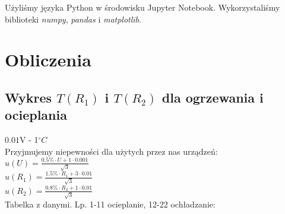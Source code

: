\documentclass[12pt]{article}
\begin{document}
Użyliśmy języka Python w środowisku Jupyter Notebook. Wykorzystaliśmy biblioteki
\textit{numpy}, \textit{pandas} i \textit{matplotlib}.
\section{Obliczenia}

\subsection*{Wykres $T(R_1)$ i $T(R_2)$ dla ogrzewania i ocieplania}
$0.01$V - 1$^{\circ}C$ \\
Przyjmujemy niepewności dla użytych przez nas urządzeń: \\
\indent $u(U) = \frac{0.5\% \cdot U+1 \cdot 0.001}{\sqrt{3}}$ \\
\indent $u(R_1) = \frac{1.5\% \cdot R_1 + 3 \cdot 0.01}{\sqrt{3}}$ \\
\indent $u(R_2) = \frac{0.8\% \cdot R_2 + 1 \cdot 0.01}{\sqrt{3}}$ \\
Tabelka z danymi. Lp. 1-11 ocieplanie, 12-22 ochładzanie:
\end{document}
